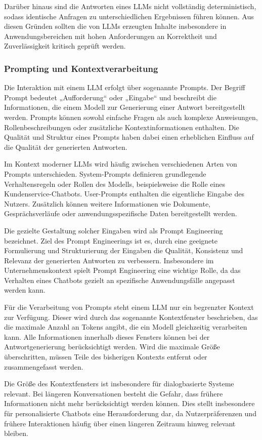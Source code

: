 Darüber hinaus sind die Antworten eines LLMs nicht vollständig deterministisch, sodass identische Anfragen zu unterschiedlichen Ergebnissen führen können. Aus diesen Gründen sollten die von LLMs erzeugten Inhalte insbesondere in Anwendungsbereichen mit hohen Anforderungen an Korrektheit und Zuverlässigkeit kritisch geprüft werden.


\subsubsection{Prompting und Kontextverarbeitung}

Die Interaktion mit einem LLM erfolgt über sogenannte Prompts. Der Begriff Prompt bedeutet „Aufforderung“ oder „Eingabe“ und beschreibt die Informationen, die einem Modell zur Generierung einer Antwort bereitgestellt werden. Prompts können sowohl einfache Fragen als auch komplexe Anweisungen, Rollenbeschreibungen oder zusätzliche Kontextinformationen enthalten. Die Qualität und Struktur eines Prompts haben dabei einen erheblichen Einfluss auf die Qualität der generierten Antworten.

Im Kontext moderner LLMs wird häufig zwischen verschiedenen Arten von Prompts unterschieden. System-Prompts definieren grundlegende Verhaltensregeln oder Rollen des Modells, beispielsweise die Rolle eines Kundenservice-Chatbots. User-Prompts enthalten die eigentliche Eingabe des Nutzers. Zusätzlich können weitere Informationen wie Dokumente, Gesprächsverläufe oder anwendungsspezifische Daten bereitgestellt werden.

Die gezielte Gestaltung solcher Eingaben wird als Prompt Engineering bezeichnet. Ziel des Prompt Engineerings ist es, durch eine geeignete Formulierung und Strukturierung der Eingaben die Qualität, Konsistenz und Relevanz der generierten Antworten zu verbessern. Insbesondere im Unternehmenskontext spielt Prompt Engineering eine wichtige Rolle, da das Verhalten eines Chatbots gezielt an spezifische Anwendungsfälle angepasst werden kann.

Für die Verarbeitung von Prompts steht einem LLM nur ein begrenzter Kontext zur Verfügung. Dieser wird durch das sogenannte Kontextfenster beschrieben, das die maximale Anzahl an Tokens angibt, die ein Modell gleichzeitig verarbeiten kann. Alle Informationen innerhalb dieses Fensters können bei der Antwortgenerierung berücksichtigt werden. Wird die maximale Größe überschritten, müssen Teile des bisherigen Kontexts entfernt oder zusammengefasst werden.

Die Größe des Kontextfensters ist insbesondere für dialogbasierte Systeme relevant. Bei längeren Konversationen besteht die Gefahr, dass frühere Informationen nicht mehr berücksichtigt werden können. Dies stellt insbesondere für personalisierte Chatbots eine Herausforderung dar, da Nutzerpräferenzen und frühere Interaktionen häufig über einen längeren Zeitraum hinweg relevant bleiben.

